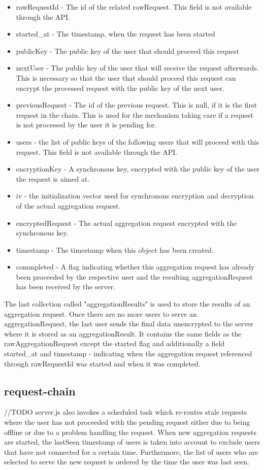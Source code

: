 \begin{itemize}
	\item rawRequestId - The id of the related rawRequest. This field is not available through the API.
	\item started\_at - The timestamp, when the request has been started
	\item publicKey - The public key of the user that should proceed this request
	\item nextUser - The public key of the user that will receive the request afterwards. This is necessary so that the user that should proceed this request can encrypt the processed request with the public key of the next user.
	\item previousRequest - The id of the previous request. This is null, if it is the first request in the chain. This is used for the mechanism taking care if a request is not processed by the user it is pending for.
	\item users - the list of public keys of the following users that will proceed with this request. This field is not available through the API.
	\item encryptionKey - A synchronous key, encrypted with the public key of the user the request is aimed at.
	\item iv - the initialization vector used for synchronous encryption and decryption of the actual aggregation request.
	\item encryptedRequest - The actual aggregation request encrypted with the synchronous key.
	\item timestamp - The timestamp when this object has been created.
	\item commpleted - A flag indicating whether this aggregation request has already been proceeded by the respective user and the resulting aggregationRequest has been received by the server.
\end{itemize}
The last collection called "aggregationResults" is used to store the results of an aggregation request. Once there are no more users to serve an aggregationRequest, the last user sends the final data unencrypted to the server where it is stored as an aggregationResult. It contains the same fields as the rawAggregationRequest except the started flag and additionally a field started\_at and timestamp - indicating when the aggregation request referenced through rawRequestId was started and when it was completed.

\subsection{request-chain}\label{request-chain}
//TODO
server.js also invokes a scheduled task which re-routes stale requests where the user has not proceeded with the pending request either due to being offline or due to a problem handling the request. When new aggregation requests are started, the lastSeen timestamp of users is taken into account to exclude users that have not connected for a certain time. Furthermore, the list of users who are selected to serve the new request is ordered by the time the user was last seen.